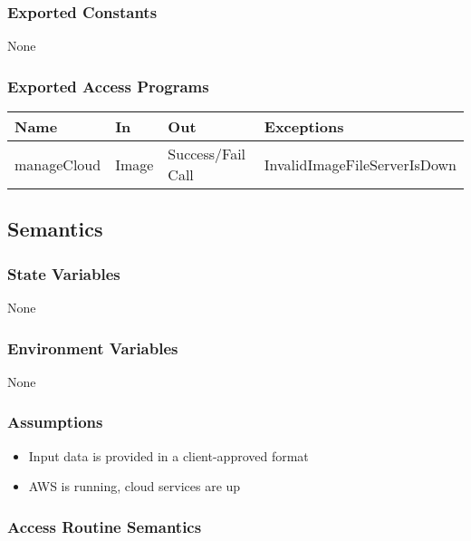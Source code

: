 \documentclass[12pt, titlepage]{article}
\begin{document}
\subsubsection{Exported Constants}

None

\subsubsection{Exported Access Programs}

\begin{center}
\begin{tabular}{p{2cm} p{4cm} p{4cm} p{2cm}}
\hline
\textbf{Name} & \textbf{In} & \textbf{Out} & \textbf{Exceptions} \\
\hline
manageCloud & Image & Success/Fail Call & InvalidImageFileServerIsDown \\
\hline
\end{tabular}
\end{center}

\subsection{Semantics}

\subsubsection{State Variables}

None

\subsubsection{Environment Variables}

None

\subsubsection{Assumptions}

\begin{itemize}
  \item Input data is provided in a client-approved format
  \item AWS is running, cloud services are up
\end{itemize}

\subsubsection{Access Routine Semantics}
\end{document}
